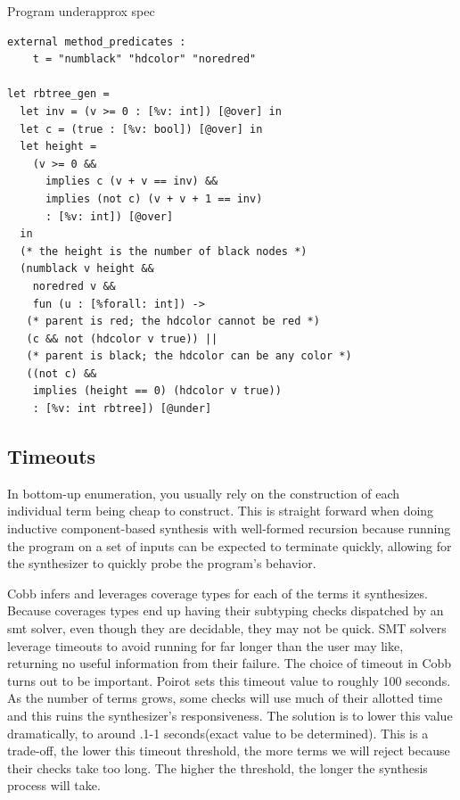 \documentclass[review, sigplan]{acmart}
\begin{document}
Program underapprox spec
\begin{lstlisting}[language=caml, basicstyle=\small\ttfamily]
external method_predicates :
    t = "numblack" "hdcolor" "noredred"

let rbtree_gen =
  let inv = (v >= 0 : [%v: int]) [@over] in
  let c = (true : [%v: bool]) [@over] in
  let height =
    (v >= 0 &&
      implies c (v + v == inv) &&
      implies (not c) (v + v + 1 == inv)
      : [%v: int]) [@over]
  in
  (* the height is the number of black nodes *)
  (numblack v height &&
    noredred v &&
    fun (u : [%forall: int]) ->
   (* parent is red; the hdcolor cannot be red *)
   (c && not (hdcolor v true)) ||
   (* parent is black; the hdcolor can be any color *)
   ((not c) &&
    implies (height == 0) (hdcolor v true))
    : [%v: int rbtree]) [@under]
\end{lstlisting}

\subsection{Timeouts}

In bottom-up enumeration, you usually rely on the construction of each
individual term being cheap to construct. This is straight forward when doing
inductive component-based synthesis with well-formed recursion because running
the program on a set of inputs can be expected to terminate quickly, allowing
for the synthesizer to quickly probe the program's behavior.

Cobb infers and leverages coverage types for each of the terms it synthesizes.
Because coverages types end up having their subtyping checks dispatched by an
smt solver, even though they are decidable, they may not be quick. SMT solvers
leverage timeouts to avoid running for far longer than the user may like,
returning no useful information from their failure. The choice of timeout in
Cobb turns out to be important. Poirot sets this timeout value to roughly 100
seconds. As the number of terms grows, some checks will use much of their
allotted time and this ruins the synthesizer's responsiveness. The solution is
to lower this value dramatically, to around .1-1 seconds(exact value to be
determined). This is a trade-off, the lower this timeout threshold, the more
terms we will reject because their checks take too long. The higher the
threshold, the longer the synthesis process will take.
\end{document}
